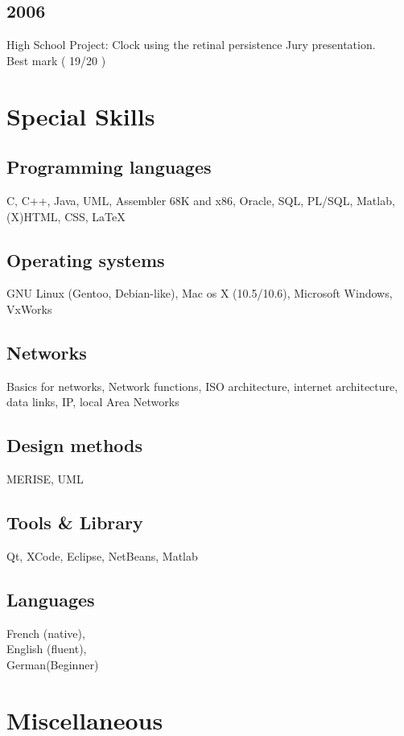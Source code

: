 	\subsection{2006}
		{High School Project: Clock using the retinal persistence Jury presentation.\\ Best mark ( 19/20 )}
		
\section{Special Skills}
	\subsection{Programming languages}
		{C, C++, Java, UML, Assembler 68K and x86, Oracle, SQL, PL/SQL, Matlab, (X)HTML, CSS, \LaTeX}
		
	\subsection{Operating systems}
		{GNU Linux (Gentoo, Debian-like), Mac os X (10.5/10.6), Microsoft Windows, VxWorks}
		
	\subsection{Networks}
		{Basics for networks, Network functions, ISO architecture, internet architecture, data links, IP, local Area Networks}
		
	\subsection{Design methods}
		{MERISE, UML}
		
	\subsection{Tools \& Library}
		{Qt, XCode, Eclipse, NetBeans, Matlab}
		
	\subsection{Languages}
		{French (native),\\English (fluent),\\German(Beginner)}
				
\section{Miscellaneous}
